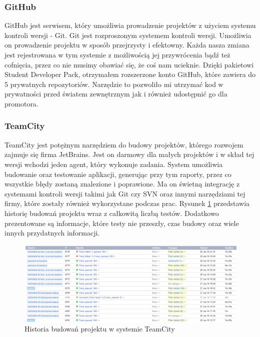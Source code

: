 \subsubsection{GitHub}
GitHub jest serwisem, który umożliwia prowadzenie projektów z użyciem systemu kontroli wersji - Git. Git jest rozproszonym systemem kontroli wersji. Umożliwia on prowadzenie projektu w sposób przejrzysty i efektowny. Każda nasza zmiana jest rejestrowana w tym systemie z możliwością jej przywrócenia bądź też cofnięcia, przez co nie musimy obawiać się, że coś nam ucieknie. Dzięki pakietowi Student Developer Pack, otrzymałem rozszerzone konto GitHub, które zawiera do 5 prywatnych repozytoriów. Narzędzie to pozwoliło mi utrzymać kod w prywatności przed światem zewnętrznym jak i również udostępnić go dla promotora.


\subsubsection{TeamCity}
TeamCity jest potężnym narzędziem do budowy projektów, którego rozwojem zajmuje się firma JetBrains. Jest on darmowy dla małych projektów i w skład tej wersji wchodzi jeden agent, który wykonuje zadania. System umożliwia budowanie oraz testowanie aplikacji, generując przy tym raporty, przez co wszystkie błędy zostaną znalezione i poprawione. Ma on świetną integrację z systemami kontroli wersji takimi jak Git czy SVN oraz innymi narzędziami tej firmy, które zostały również wykorzystane podczas prac. Rysunek \ref{fig:teamcity} przedstawia historię budowań projektu wraz z całkowitą liczbą testów. Dodatkowo prezentowane są informacje, które testy nie przeszły, czas budowy oraz wiele innych przydatnych informacji.

\begin{figure}[h!]
	\centering
	\includegraphics[width=15cm]{rysunki/screenshot_teamcity.png}	
	\caption{Historia budowań projektu w systemie TeamCity}
	\label{fig:teamcity}
\end{figure}


